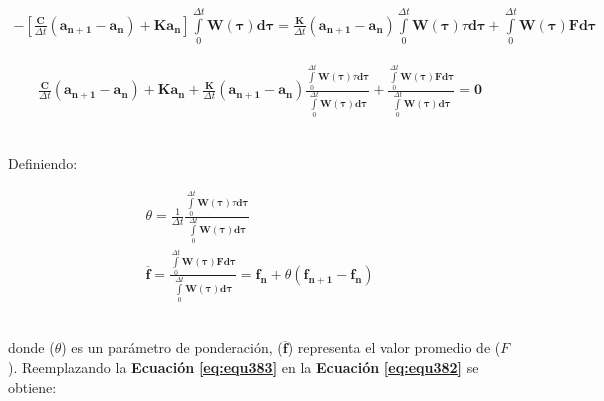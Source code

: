 \begin{ceqn} %
\begin{gather}\label{eq:equ381}
-\left[\frac{\mathbf{C}}{\Delta t}(\mathbf{a_{n+1}} - \mathbf{a_n}) + \mathbf{K}\mathbf{a_n}\right]\int\limits_0^{\Delta t} \mathbf{W(\tau)}\mathbf{d\tau}
= \frac{\mathbf{K}}{\Delta t}(\mathbf{a_{n+1}} - \mathbf{a_n})\int\limits_0^{\Delta t} \mathbf{W(\tau)}\tau\mathbf{d\tau} +  \int\limits_0^{\Delta t} \mathbf{W(\tau)}\mathbf{F}\mathbf{d\tau}
\end{gather}   
\end{ceqn}

\begin{ceqn} %
\begin{gather}\label{eq:equ382}
\frac{\mathbf{C}}{\Delta t}(\mathbf{a_{n+1}} - \mathbf{a_n}) + \mathbf{K}\mathbf{a_n}
+ \frac{\mathbf{K}}{\Delta t}(\mathbf{a_{n+1}} - \mathbf{a_n}) \frac{\int\limits_0^{\Delta t} \mathbf{W(\tau)}\tau\mathbf{d\tau}}{\int\limits_0^{\Delta t} \mathbf{W(\tau)}\mathbf{d\tau}} +  \frac{\int\limits_0^{\Delta t} \mathbf{W(\tau)}\mathbf{F}\mathbf{d\tau}}{\int\limits_0^{\Delta t} \mathbf{W(\tau)}\mathbf{d\tau}} = \mathbf{0}
\end{gather}   
\end{ceqn}
\\
Definiendo:

\begin{ceqn} 
\begin{subequations} \label{eq:equ383} 
\begin{gather}
\theta = \frac{1}{\Delta t}\frac{\int\limits_0^{\Delta t} \mathbf{W(\tau)}\tau\mathbf{d\tau}}{\int\limits_0^{\Delta t} \mathbf{W(\tau)}\mathbf{d\tau}}\label{eq:equ38a}\\[12pt]
\mathbf{\overline{f}} = \frac{\int\limits_0^{\Delta t} \mathbf{W(\tau)}\mathbf{F}\mathbf{d\tau}}{\int\limits_0^{\Delta t} \mathbf{W(\tau)}\mathbf{d\tau}} = \mathbf{f_n} + \theta(\mathbf{f_{n+1}}-\mathbf{f_n}) \label{eq:equ383b}
\end{gather}  
\end{subequations} 
\end{ceqn}
\\
donde ($\theta$) es un parámetro de ponderación, ($\mathbf{\overline{f}}$) representa el valor promedio de ($F$). Reemplazando la \textbf{Ecuación} \textbf{\ref{eq:equ383}} en la \textbf{Ecuación} \textbf{\ref{eq:equ382}} se obtiene:

